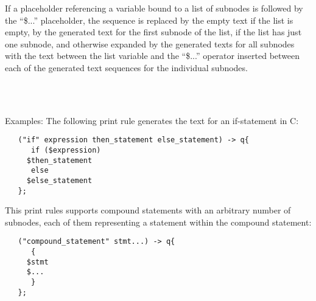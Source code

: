 If a placeholder referencing a variable bound to a list of 
subnodes is followed by the ``\$...'' placeholder, the
sequence is replaced by the empty text if the list is empty,
by the generated text for the first subnode of the list, if
the list has just one subnode, and otherwise expanded
by the generated texts for all subnodes with the text between
the list variable and the ``\$...'' operator inserted between
each of the generated text sequences for the individual subnodes.

\begin{grammar}
      \produces \lextoken{\$}  \\
      \produces \lextoken{\$}
	 \lextoken{\{}  \lextoken{\}} \\
      \produces {}
\end{grammar}

\noindent
Examples: The following print rule generates the text for an
if-statement in C:

\begin{lstlisting}
   ("if" expression then_statement else_statement) -> q{
      if ($expression)
	 $then_statement
      else
	 $else_statement
   };
\end{lstlisting}

\noindent
This print rules supports compound statements with an arbitrary
number of subnodes, each of them representing a statement within
the compound statement:

\begin{lstlisting}
   ("compound_statement" stmt...) -> q{
      {
	 $stmt
	 $...
      }
   };
\end{lstlisting}

\endinput
